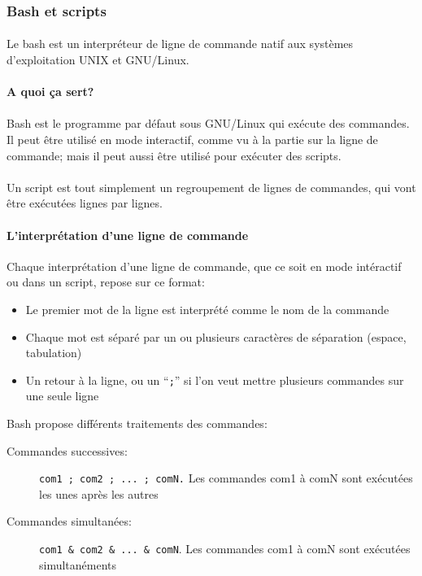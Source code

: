 \subsubsection*{Bash et scripts}

\paragraph{} Le bash est un interpréteur de ligne de commande natif aux
systèmes d'exploitation UNIX et GNU/Linux.

\paragraph{A quoi ça sert?}

\paragraph{} Bash est le programme par défaut sous GNU/Linux qui exécute des
commandes. Il peut être utilisé en mode interactif, comme vu à la partie sur la
ligne de commande; mais il peut aussi être utilisé pour exécuter des scripts.

\paragraph{} Un script est tout simplement un regroupement de lignes de
commandes, qui vont être exécutées lignes par lignes.

\paragraph{L'interprétation d'une ligne de commande}

Chaque interprétation d'une ligne de commande, que ce soit en mode intéractif
ou dans un script, repose sur ce format:

\begin{itemize}
	\item Le premier mot de la ligne est interprété comme le nom de la commande
	\item Chaque mot est séparé par un ou plusieurs caractères de séparation
		(espace, tabulation)
	\item Un retour à la ligne, ou un ``\texttt{;}'' si l'on veut mettre
		plusieurs commandes sur une seule ligne
\end{itemize}

Bash propose différents traitements des commandes:
\begin{description}
	\item[Commandes successives:] \texttt{com1 ; com2 ; ... ; comN.}
		Les commandes com1 à comN sont exécutées les unes après les autres
	\item[Commandes simultanées:] \texttt{com1 & com2 & ...  & comN}.
		Les commandes com1 à comN sont exécutées simultanéments
\end{description}


